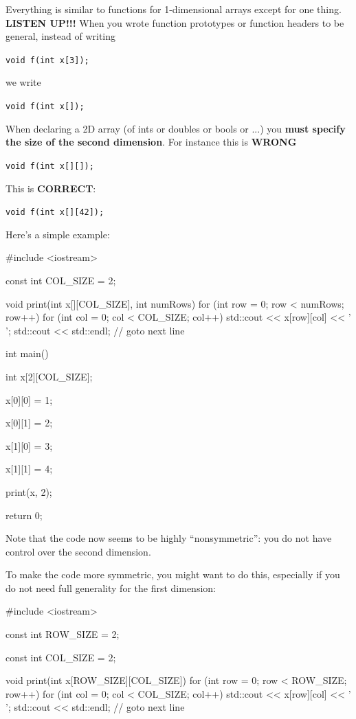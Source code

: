 \begin{ex}
Everything is similar to functions for 1-dimensional arrays except for one thing. \textbf{LISTEN UP!!!} When you wrote function prototypes or function headers to be general, instead of writing

\verb!void f(int x[3]);!

we write

\verb!void f(int x[]);!

When declaring a 2D array (of ints or doubles or bools or ...) you \textbf{must specify the size of the second dimension}. For instance this is \textbf{WRONG}

\verb!void f(int x[][]);!

This is \textbf{CORRECT}:

\verb!void f(int x[][42]);!

Here's a simple example:

\begin{consolethree}
#include <iostream>

const int COL_SIZE = 2;

void print(int x[][COL_SIZE], int numRows)
{
     for (int row = 0; row < numRows; row++)
     {
          for (int col = 0; col < COL_SIZE; col++)
          {
            std::cout << x[row][col] << ' ';
          }
     }
     std::cout << std::endl; // goto next line
}

int main()
{
    int x[2][COL_SIZE];

    x[0][0] = 1;
    
    x[0][1] = 2;

    x[1][0] = 3;

    x[1][1] = 4;

    print(x, 2);

    return 0;
}
\end{consolethree}

Note that the code now seems to be highly ``nonsymmetric'': you do not have control over the second dimension.

To make the code more symmetric, you might want to do this, especially if you do not need full generality for the first dimension:

\begin{consolethree}
#include <iostream>

const int ROW_SIZE = 2;

const int COL_SIZE = 2;

void print(int x[ROW_SIZE][COL_SIZE])
{
     for (int row = 0; row < ROW_SIZE; row++)
     {
          for (int col = 0; col < COL_SIZE; col++)
          {
               std::cout << x[row][col] << ' ';
          }
     }
     std::cout << std::endl; // goto next line
}


\end{consolethree}
\end{ex}
